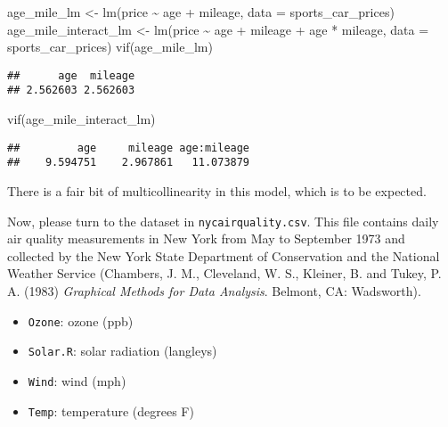 \documentclass[
]{article}
\newenvironment{Shaded}{\begin{snugshade}}{\end{snugshade}}
\newcommand{\AttributeTok}[1]{\textcolor[rgb]{0.77,0.63,0.00}{#1}}
\newcommand{\FunctionTok}[1]{\textcolor[rgb]{0.00,0.00,0.00}{#1}}
\newcommand{\NormalTok}[1]{#1}
\newcommand{\OtherTok}[1]{\textcolor[rgb]{0.56,0.35,0.01}{#1}}
\newcommand{\SpecialCharTok}[1]{\textcolor[rgb]{0.00,0.00,0.00}{#1}}
\providecommand{\tightlist}{%
  \setlength{\itemsep}{0pt}\setlength{\parskip}{0pt}}
\begin{document}
\begin{Shaded}
\begin{Highlighting}[]
\NormalTok{age\_mile\_lm }\OtherTok{\textless{}{-}} \FunctionTok{lm}\NormalTok{(price }\SpecialCharTok{\textasciitilde{}}\NormalTok{ age }\SpecialCharTok{+}\NormalTok{ mileage, }\AttributeTok{data =}\NormalTok{ sports\_car\_prices)}
\NormalTok{age\_mile\_interact\_lm }\OtherTok{\textless{}{-}} \FunctionTok{lm}\NormalTok{(price }\SpecialCharTok{\textasciitilde{}}\NormalTok{ age }\SpecialCharTok{+}\NormalTok{ mileage }\SpecialCharTok{+}\NormalTok{ age }\SpecialCharTok{*}\NormalTok{ mileage,}
                           \AttributeTok{data =}\NormalTok{ sports\_car\_prices)}
\FunctionTok{vif}\NormalTok{(age\_mile\_lm)}
\end{Highlighting}
\end{Shaded}

\begin{verbatim}
##      age  mileage 
## 2.562603 2.562603
\end{verbatim}

\begin{Shaded}
\begin{Highlighting}[]
\FunctionTok{vif}\NormalTok{(age\_mile\_interact\_lm)}
\end{Highlighting}
\end{Shaded}

\begin{verbatim}
##         age     mileage age:mileage 
##    9.594751    2.967861   11.073879
\end{verbatim}

There is a fair bit of multicollinearity in this model, which is to be
expected.

Now, please turn to the dataset in \texttt{nycairquality.csv}. This file
contains daily air quality measurements in New York from May to
September 1973 and collected by the New York State Department of
Conservation and the National Weather Service (Chambers, J. M.,
Cleveland, W. S., Kleiner, B. and Tukey, P. A. (1983) \emph{Graphical
Methods for Data Analysis}. Belmont, CA: Wadsworth).

\begin{itemize}
\tightlist
\item
  \texttt{Ozone}: ozone (ppb)
\item
  \texttt{Solar.R}: solar radiation (langleys)
\item
  \texttt{Wind}: wind (mph)
\item
  \texttt{Temp}: temperature (degrees F)
\end{itemize}
\end{document}
